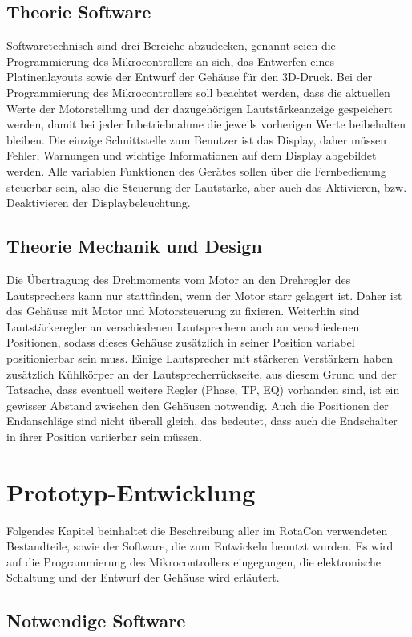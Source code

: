 \documentclass[11pt, titlepage, fleqn]{report}
\begin{document}
		\section{Theorie Software}
		\label{sec:Theorie Software}
			Softwaretechnisch sind drei Bereiche abzudecken, genannt seien die Programmierung des Mikrocontrollers an sich, das Entwerfen eines Platinenlayouts sowie der Entwurf der Gehäuse für den 3D-Druck. Bei der Programmierung des Mikrocontrollers soll beachtet werden, dass die aktuellen Werte der Motorstellung und der dazugehörigen Lautstärkeanzeige gespeichert werden, damit bei jeder Inbetriebnahme die jeweils vorherigen Werte beibehalten bleiben. Die einzige Schnittstelle zum Benutzer ist das Display, daher müssen Fehler, Warnungen und wichtige Informationen auf dem Display abgebildet werden. Alle variablen Funktionen des Gerätes sollen über die Fernbedienung steuerbar sein, also die Steuerung der Lautstärke, aber auch das Aktivieren, bzw. Deaktivieren der Displaybeleuchtung.
		\section{Theorie Mechanik und Design}
		\label{sec:Design}
			Die Übertragung des Drehmoments vom Motor an den Drehregler des Lautsprechers kann nur stattfinden, wenn der Motor starr gelagert ist. Daher ist das Gehäuse mit Motor und Motorsteuerung zu fixieren. Weiterhin sind Lautstärkeregler an verschiedenen Lautsprechern auch an verschiedenen Positionen, sodass dieses Gehäuse zusätzlich in seiner Position variabel positionierbar sein muss. Einige Lautsprecher mit stärkeren Verstärkern haben zusätzlich Kühlkörper an der Lautsprecherrückseite, aus diesem Grund und der Tatsache, dass eventuell weitere Regler (Phase, TP, EQ) vorhanden sind, ist ein gewisser Abstand zwischen den Gehäusen notwendig. Auch die Positionen der Endanschläge sind nicht überall gleich, das bedeutet, dass auch die Endschalter in ihrer Position variierbar sein müssen.
		\label{sec:Theorie Mechanik}
	\chapter{Prototyp-Entwicklung}
	\label{sec:Praxistil}
		Folgendes Kapitel beinhaltet die Beschreibung aller im RotaCon verwendeten Bestandteile, sowie der Software, die zum Entwickeln benutzt wurden.
		Es wird auf die Programmierung des Mikrocontrollers eingegangen, die elektronische Schaltung und der Entwurf der Gehäuse wird erläutert.
		\section{Notwendige Software}
\end{document}
